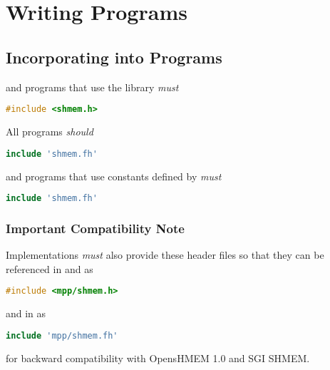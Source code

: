 \section{Writing \openshmem{} Programs}

\subsection*{Incorporating \openshmem{} into Programs}


\Clang{} and \Cpp{} programs that use the \openshmem library \emph{must}

\begin{lstlisting}[language=C++]
#include <shmem.h>
\end{lstlisting}

All \Fortran{} \openshmem programs \emph{should}

\begin{lstlisting}[language=Fortran]
include 'shmem.fh'
\end{lstlisting}

and \Fortran{} \openshmem programs that use constants defined by \openshmem
\emph{must}

\begin{lstlisting}[language=Fortran]
include 'shmem.fh'
\end{lstlisting}

\subsubsection*{\textbf{Important Compatibility Note}}

Implementations \emph{must} also provide these header files so that
they can be referenced in \Clang{} and \Cpp{} as

\begin{lstlisting}[language=C++]
#include <mpp/shmem.h>
\end{lstlisting}

and in \Fortran{} as

\begin{lstlisting}[language=Fortran]
include 'mpp/shmem.fh'
\end{lstlisting}

for backward compatibility with OpensHMEM 1.0 and SGI SHMEM.

